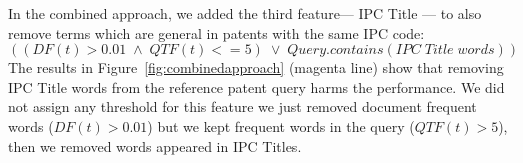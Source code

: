 In the combined approach, we added the third feature--- IPC Title --- to also remove terms which are general in patents with the same IPC code: 
\begin{displaymath} \left(  \left(DF(t)>0.01\; \wedge \; QTF(t)<=5\right)\; \vee\; Query.contains(IPC \; Title \; words) \right)\end{displaymath}
The results in Figure~\ref{fig:combinedapproach} (magenta line) show that removing IPC Title words from the reference patent query harms the performance. We did not assign any threshold for this feature we just removed document frequent words ($DF(t)>0.01$) but we kept frequent words in the query ($QTF(t)>5$), then we removed words appeared in IPC Titles.   
